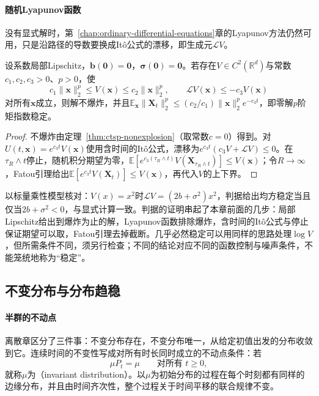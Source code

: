 \paragraph{随机Lyapunov函数}
没有显式解时，第~\ref{chap:ordinary-differential-equations}章的Lyapunov方法仍然可用，只是沿路径的导数要换成Itô公式的漂移，即生成元$\mathcal LV$。

\begin{theorem}[矩稳定的Lyapunov判据]
  \label{thm:ctsp-lyapunov-moment}
  设系数局部Lipschitz，$\bm b(\bm0)=\bm0$，$\bm\sigma(\bm0)=\bm0$。若存在$V\in C^2(\mathbb R^d)$与常数$c_1,c_2,c_3>0$、$p>0$，使
  \[
    c_1\|\bm x\|_2^p\leq V(\bm x)\leq c_2\|\bm x\|_2^p,\qquad\mathcal LV(\bm x)\leq-c_3V(\bm x)
  \]
  对所有$\bm x$成立，则解不爆炸，并且$\mathbb E_{\bm x}\|\bm X_t\|_2^p\leq(c_2/c_1)\|\bm x\|_2^pe^{-c_3t}$，即零解$p$阶矩指数稳定。
\end{theorem}

\begin{proof}
不爆炸由定理~\ref{thm:ctsp-nonexplosion}（取常数$c=0$）得到。对$U(t,\bm x)=e^{c_3t}V(\bm x)$使用含时间的Itô公式，漂移为$e^{c_3t}(c_3V+\mathcal LV)\leq0$。在$\tau_R\wedge t$停止，随机积分期望为零，$\mathbb E[e^{c_3(\tau_R\wedge t)}V(\bm X_{\tau_R\wedge t})]\leq V(\bm x)$；令$R\to\infty$，Fatou引理给出$\mathbb E[e^{c_3t}V(\bm X_t)]\leq V(\bm x)$，再代入$V$的上下界。
\end{proof}

以标量乘性模型核对：$V(x)=x^2$时$\mathcal LV=(2b+\sigma^2)x^2$，判据给出均方稳定当且仅当$2b+\sigma^2<0$，与显式计算一致。判据的证明串起了本章前面的几步：局部Lipschitz给出到爆炸为止的解，Lyapunov函数排除爆炸，含时间的Itô公式与停止保证期望可以取，Fatou引理去掉截断。几乎必然稳定可以用同样的思路处理$\log V$，但所需条件不同，须另行检查；不同的结论对应不同的函数控制与噪声条件，不能笼统地称为“稳定”。

\subsection{不变分布与分布趋稳}
\label{sec:ctsp-invariant}

\paragraph{半群的不动点}
离散章区分了三件事：不变分布存在，不变分布唯一，从给定初值出发的分布收敛到它。连续时间的不变性写成对所有时长同时成立的不动点条件：若
\[
  \mu P_t=\mu\qquad\text{对所有 }t\geq0 ,
\]
就称$\mu$为（invariant distribution）。以$\mu$为初始分布的过程在每个时刻都有同样的边缘分布，并且由时间齐次性，整个过程关于时间平移的联合规律不变。

